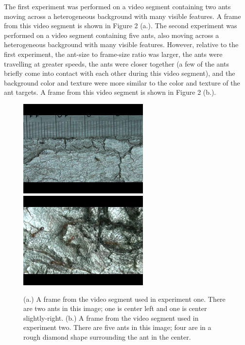 \documentclass{article}
\begin{document}
The first experiment was performed on a video segment containing two ants moving across a heterogeneous background with many visible features. A frame from this video segment is shown in Figure 2 (a.). The second experiment was performed on a video segment containing five ants, also moving across a heterogeneous background with many visible features. However, relative to the first experiment, the ant-size to frame-size ratio was larger, the ants were travelling at greater speeds, the ants were closer together (a few of the ants briefly come into contact with each other during this video segment), and the background color and texture were more similar to the color and texture of the ant targets. A frame from this video segment is shown in Figure 2 (b.).
\begin{figure}
\centering
{\includegraphics[width=65mm]{antpic1.png}}
\hspace{8mm}
{\includegraphics[width=65mm]{antpic2.png}}
\caption{(a.) A frame from the video segment used in experiment one. There are two ants in this image; one is center left and one is center slightly-right.  (b.) A frame from the video segment used in experiment two. There are five ants in this image; four are in a rough diamond shape surrounding the ant in the center.}
\label{test}
\end{figure}
\end{document}
